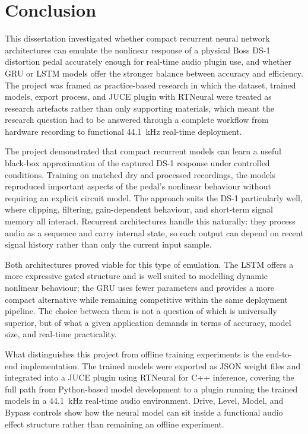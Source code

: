 \chapter{Conclusion}

This dissertation investigated whether compact recurrent neural network architectures can emulate the nonlinear response of a physical Boss DS-1 distortion pedal accurately enough for real-time audio plugin use, and whether GRU or LSTM models offer the stronger balance between accuracy and efficiency. The project was framed as practice-based research in which the dataset, trained models, export process, and JUCE plugin with RTNeural were treated as research artefacts rather than only supporting materials, which meant the research question had to be answered through a complete workflow from hardware recording to functional 44.1~kHz real-time deployment.

The project demonstrated that compact recurrent models can learn a useful black-box approximation of the captured DS-1 response under controlled conditions. Training on matched dry and processed recordings, the models reproduced important aspects of the pedal's nonlinear behaviour without requiring an explicit circuit model. The approach suits the DS-1 particularly well, where clipping, filtering, gain-dependent behaviour, and short-term signal memory all interact. Recurrent architectures handle this naturally: they process audio as a sequence and carry internal state, so each output can depend on recent signal history rather than only the current input sample.

Both architectures proved viable for this type of emulation. The LSTM offers a more expressive gated structure and is well suited to modelling dynamic nonlinear behaviour; the GRU uses fewer parameters and provides a more compact alternative while remaining competitive within the same deployment pipeline. The choice between them is not a question of which is universally superior, but of what a given application demands in terms of accuracy, model size, and real-time practicality.

What distinguishes this project from offline training experiments is the end-to-end implementation. The trained models were exported as JSON weight files and integrated into a JUCE plugin using RTNeural for C++ inference, covering the full path from Python-based model development to a plugin running the trained models in a 44.1~kHz real-time audio environment. Drive, Level, Model, and Bypass controls show how the neural model can sit inside a functional audio effect structure rather than remaining an offline experiment.

